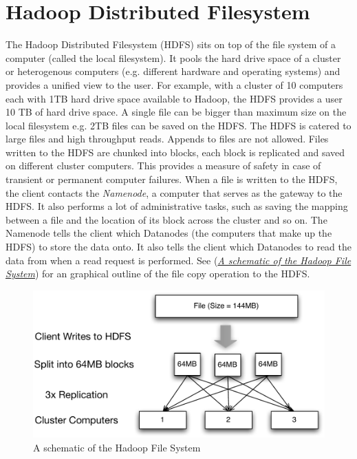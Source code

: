 \documentclass[letterpaper,10pt,english]{sphinxmanual}
\begin{document}
\section{Hadoop Distributed Filesystem}
\label{introduction:hadoop-distributed-filesystem}
The Hadoop Distributed Filesystem (HDFS) sits on top of the file system of a
computer (called the local filesystem). It pools the hard drive space of a
cluster or heterogenous computers (e.g. different hardware and operating
systems) and provides a unified view to the user. For example, with a cluster of
10 computers each with 1TB hard drive space available to Hadoop, the HDFS
provides a user 10 TB of hard drive space. A single file can be bigger than
maximum size on the local filesystem e.g. 2TB files can be saved on the
HDFS. The HDFS is catered to large files and high throughput reads. Appends to
files are not allowed. Files written to the HDFS are chunked into blocks, each
block is replicated and saved on different cluster computers. This provides a
measure of safety in case of transient or permanent computer failures.  When a
file is written to the HDFS, the client contacts the \emph{Namenode}, a computer that
serves as the gateway to the HDFS. It also performs a lot of administrative
tasks, such as saving the mapping between a file and the location of its block
across the cluster and so on. The Namenode tells the client which Datanodes (the
computers that make up the HDFS) to store the data onto. It also tells the
client which Datanodes to read the data from when a read request is
performed. See ({\hyperref[introduction:hadoopschematic]{\emph{A schematic of the Hadoop File System}}}) for an graphical outline of the file
copy operation to the HDFS.
\begin{figure}[htbp]
\centering
\capstart

\includegraphics{hdfs-write.pdf}
\caption{A schematic of the Hadoop File System}\label{introduction:hadoopschematic}\end{figure}
\end{document}
